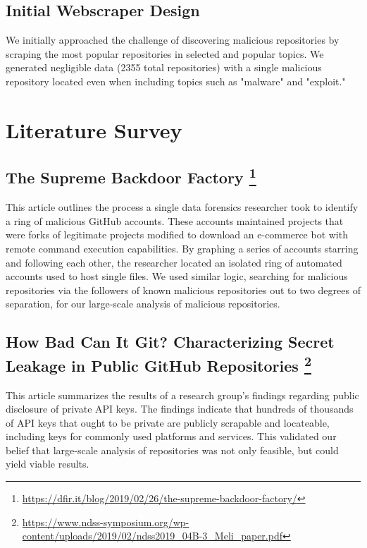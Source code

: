 \documentclass[]{acmart}
\begin{document}
\subsection{Initial Webscraper Design}
We initially approached the challenge of discovering malicious repositories by scraping the most popular repositories in selected and popular topics. We generated negligible data (2355 total repositories) with a single malicious repository located even when including topics such as "malware" and "exploit." 
\section{Literature Survey}
\subsection[The Supreme Backdoor Factory]{The Supreme Backdoor Factory         \footnote{\url{https://dfir.it/blog/2019/02/26/the-supreme-backdoor-factory/}}
}
This article outlines the process a single data forensics researcher took to identify a ring of malicious GitHub accounts. These accounts maintained projects that were  forks of legitimate projects modified to download an e-commerce bot with remote command execution capabilities. By graphing a series of accounts starring and following each other, the researcher located an isolated ring of automated accounts used to host single files. We used similar logic, searching for malicious repositories via the followers of known malicious repositories out to two degrees of separation, for our large-scale analysis of malicious repositories.
\subsection[How Bad Can It Git? Characterizing Secret Leakage in Public GitHub Repositories]{How Bad Can It Git? Characterizing Secret Leakage in Public GitHub Repositories \footnote{\url{https://www.ndss-symposium.org/wp-content/uploads/2019/02/ndss2019_04B-3_Meli_paper.pdf}}
}
This article summarizes the results of a research group's findings regarding public disclosure of private API keys. The findings indicate that hundreds of thousands of API keys that ought to be private are publicly scrapable and locateable, including keys for commonly used platforms and services. This validated our belief that large-scale analysis of repositories was not only feasible, but could yield viable results.
\end{document}
